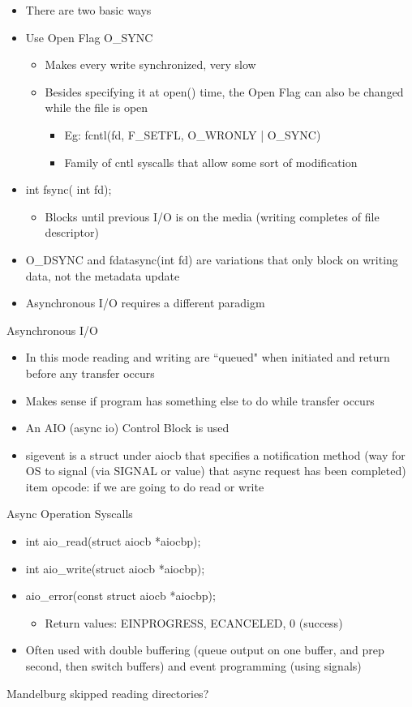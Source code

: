 \begin{itemize}
    \item There are two basic ways
    \item Use Open Flag O\_SYNC
    \begin{itemize}
        \item Makes every write synchronized, very slow
        \item Besides specifying it at open() time, the Open Flag can also be changed while the file is open
        \begin{itemize}
            \item Eg: fcntl(fd, F\_SETFL, O\_WRONLY | O\_SYNC)
            \item Family of cntl syscalls that allow some sort of modification
        \end{itemize}
    \end{itemize}
    \item int fsync( int fd);
    \begin{itemize}
        \item Blocks until previous I/O is on the media (writing completes of file descriptor)
    \end{itemize}
    \item O\_DSYNC and fdatasync(int fd) are variations that only block on writing data, not the metadata update
    \item Asynchronous I/O requires a different paradigm
\end{itemize}
Asynchronous I/O
\begin{itemize}
    \item In this mode reading and writing are ``queued" when initiated and return before any transfer occurs
    \item Makes sense if program has something else to do while transfer occurs
    \item An AIO (async io) Control Block is used
    \item sigevent is a struct under aiocb that specifies a notification method (way for OS to signal (via SIGNAL or value) that async request has been completed)
    item opcode: if we are going to do read or write
\end{itemize}
Async Operation Syscalls
\begin{itemize}
    \item int aio\_read(struct aiocb *aiocbp);
    \item int aio\_write(struct aiocb *aiocbp);
    \item aio\_error(const struct aiocb *aiocbp);
    \begin{itemize}
        \item Return values: EINPROGRESS, ECANCELED, 0 (success)
    \end{itemize}
    \item Often used with double buffering (queue output on one buffer, and prep second, then switch buffers) and event programming (using signals)
\end{itemize}
Mandelburg skipped reading directories?
